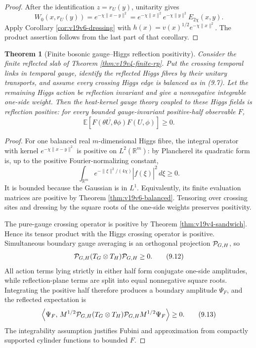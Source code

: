 \documentclass[11pt]{article}
\newtheorem{theorem}{Theorem}[section]
\theoremstyle{remark}
\begin{document}
\begin{proof}
After the identification \(z=r_U(y)\), unitarity gives
\[
 W_0(x,r_U(y))
 =e^{-\chi\|x-y\|^2}
 =e^{-\chi\|x\|^2}e^{-\chi\|y\|^2}
  E_{2\chi}(x,y).                                               \tag{9.9}
\]
Apply Corollary \ref{cor:v19v6-dressing} with
\(h(x)=v(x)^{1/2}e^{-\chi\|x\|^2}\).  The product assertion follows from
the last part of that corollary.
\end{proof}

\begin{theorem}[Finite bosonic gauge--Higgs reflection positivity]
\label{thm:v19v6-bosonic-rp}
Consider the finite reflected slab of Theorem
\ref{thm:v19v4-finite-rp}.  Put the crossing temporal links in temporal
gauge, identify the reflected Higgs fibres by their unitary transports, and
assume every crossing Higgs edge is balanced as in (9.7).  Let the remaining
Higgs action be reflection invariant and give a nonnegative integrable
one-side weight.  Then the heat-kernel gauge theory coupled to these Higgs
fields is reflection positive: for every bounded gauge-invariant
positive-half observable \(F\),
\[
 \mathbb E\!\left[\overline{F(\theta U,\theta\phi)}
                         F(U,\phi)\right]\geq0.                 \tag{9.10}
\]
\end{theorem}

\begin{proof}
For one balanced real \(m\)-dimensional Higgs fibre, the integral operator
with kernel \(e^{-\chi\|x-y\|^2}\) is positive on \(L^2(\mathbb R^m)\):
by Plancherel its quadratic form is, up to the positive Fourier-normalizing
constant,
\[
 \int_{\mathbb R^m}
 e^{-\|\xi\|^2/(4\chi)}|\widehat f(\xi)|^2\,d\xi\geq0.          \tag{9.11}
\]
It is bounded because the Gaussian is in \(L^1\).  Equivalently, its
finite evaluation matrices are positive by Theorem
\ref{thm:v19v6-balanced}.  Tensoring over crossing sites and dressing by
the square roots of the one-side weights preserves positivity.

The pure-gauge crossing operator is positive by Theorem
\ref{thm:v19v4-sandwich}.  Hence its tensor product with the Higgs crossing
operator is positive.  Simultaneous boundary gauge averaging is an
orthogonal projection \({\cal P}_{G,H}\), so
\[
 {\cal P}_{G,H}(T_G\otimes T_H){\cal P}_{G,H}\geq0.             \tag{9.12}
\]
All action terms lying strictly in either half form conjugate one-side
amplitudes, while reflection-plane terms are split into equal nonnegative
square roots.  Integrating the positive half therefore produces a boundary
amplitude \(\Psi_F\), and the reflected expectation is
\[
 \left\langle\Psi_F,\,
 M^{1/2}{\cal P}_{G,H}(T_G\otimes T_H)
 {\cal P}_{G,H}M^{1/2}\Psi_F\right\rangle\geq0.                 \tag{9.13}
\]
The integrability assumption justifies Fubini and approximation from
compactly supported cylinder functions to bounded \(F\).
\end{proof}
\end{document}
